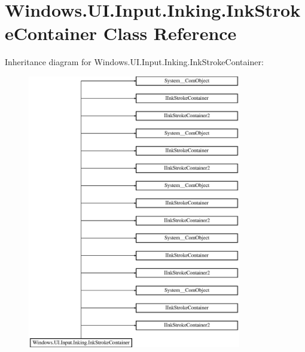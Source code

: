 \hypertarget{class_windows_1_1_u_i_1_1_input_1_1_inking_1_1_ink_stroke_container}{}\section{Windows.\+U\+I.\+Input.\+Inking.\+Ink\+Stroke\+Container Class Reference}
\label{class_windows_1_1_u_i_1_1_input_1_1_inking_1_1_ink_stroke_container}
Inheritance diagram for Windows.\+U\+I.\+Input.\+Inking.\+Ink\+Stroke\+Container\+:\begin{figure}[H]
\begin{center}
\leavevmode
\includegraphics[height=12.000000cm]{class_windows_1_1_u_i_1_1_input_1_1_inking_1_1_ink_stroke_container}
\end{center}
\end{figure}
